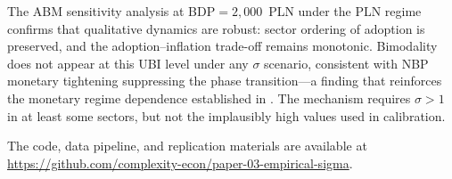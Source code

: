 \documentclass[11pt,a4paper]{article}
\begin{document}
The ABM sensitivity analysis at BDP$=2{,}000$~PLN under the PLN regime confirms that qualitative dynamics are robust: sector ordering of adoption is preserved, and the adoption--inflation trade-off remains monotonic.
Bimodality does not appear at this UBI level under any $\sigma$ scenario, consistent with NBP monetary tightening suppressing the phase transition---a finding that reinforces the monetary regime dependence established in \autocite{maciaszek2026monetary}.
The mechanism requires $\sigma > 1$ in at least some sectors, but not the implausibly high values used in calibration.

The code, data pipeline, and replication materials are available at \url{https://github.com/complexity-econ/paper-03-empirical-sigma}.


\printbibliography
\end{document}
